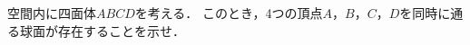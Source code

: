 \documentclass[../../main.tex]{subfiles}
\begin{document}
空間内に四面体$ABCD$を考える．
このとき，4つの頂点$A$，$B$，$C$，$D$を同時に通る球面が存在することを示せ．
\end{document}
